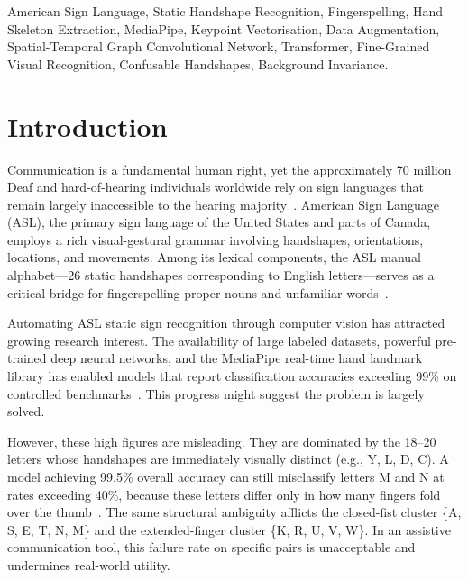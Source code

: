 \documentclass[conference]{IEEEtran}
\begin{document}
\begin{IEEEkeywords}
American Sign Language, Static Handshape Recognition, Fingerspelling, Hand
Skeleton Extraction, MediaPipe, Keypoint Vectorisation, Data Augmentation,
Spatial-Temporal Graph Convolutional Network, Transformer, Fine-Grained Visual
Recognition, Confusable Handshapes, Background Invariance.
\end{IEEEkeywords}

\section{Introduction}
\label{sec:intro}

Communication is a fundamental human right, yet the approximately 70 million
Deaf and hard-of-hearing individuals worldwide rely on sign languages that remain
largely inaccessible to the hearing majority~\cite{wfd2023}. American Sign
Language (ASL), the primary sign language of the United States and parts of
Canada, employs a rich visual-gestural grammar involving handshapes, orientations,
locations, and movements. Among its lexical components, the ASL manual
alphabet---26 static handshapes corresponding to English letters---serves as a
critical bridge for fingerspelling proper nouns and unfamiliar words~\cite{sutton1999}.

Automating ASL static sign recognition through computer vision has attracted
growing research interest. The availability of large labeled datasets, powerful
pre-trained deep neural networks, and the MediaPipe real-time hand landmark
library has enabled models that report classification accuracies exceeding 99\%
on controlled benchmarks~\cite{taskiran2023,hassan2025}. This progress might
suggest the problem is largely solved.

However, these high figures are misleading. They are dominated by the 18--20
letters whose handshapes are immediately visually distinct (e.g., Y, L, D, C).
A model achieving 99.5\% overall accuracy can still misclassify letters M and N
at rates exceeding 40\%, because these letters differ only in how many fingers
fold over the thumb~\cite{pixels2letters2025}. The same structural ambiguity
afflicts the closed-fist cluster \{A, S, E, T, N, M\} and the extended-finger
cluster \{K, R, U, V, W\}. In an assistive communication tool, this failure rate
on specific pairs is unacceptable and undermines real-world utility.
\end{document}
